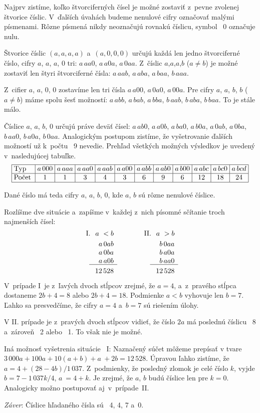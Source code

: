 {%
Najprv zistíme, koľko štvorciferných čísel je možné
zostaviť z~pevne zvolenej štvorice číslic. V~ďalších úvahách
budeme nenulové cifry označovať malými písmenami. Rôzne písmená nikdy
neoznačujú rovnakú číslicu, symbol~ 0 označuje nulu.

 Štvorice číslic $(a,a,a,a)$ a~$(a,0,0,0)$ určujú každá
len jedno štvorciferné číslo, cifry $a$, $a$, $a$, 0 tri:
$a\,aa0$, $a\,a0a$, $a\,0aa$. Z~číslic $a$,$a$,$a$,$b$ ($a\ne
b$) je možné zostaviť len štyri štvorciferné čísla: $a\,aab$,
$a\,aba$, $a\,baa$, $b\,aaa$.

 Z~cifier $a$, $a$, 0, 0 zostavíme len tri čísla $a\,a00$, $a\,0a0$,
$a\,00a$. Pre cifry $a$, $a$, $b$, $b$ ($a\ne b$) máme spolu
šesť možností: $a\,abb$, $a\,bab$, $a\,bba$, $b\,aab$, $b\,aba$,
$b\,baa$. To je stále málo.

 Číslice $a$, $a$, $b$, 0 určujú práve deväť čísel: $a\,ab0$,
$a\,a0b$, $a\,ba0$, $a\,b0a$, $a\,0ab$, $a\,0ba$, $b\,aa0$,
$b\,a0a$, $b\,0aa$. Analogickým postupom zistíme, že vyšetrovanie
ďalších možností už k~počtu~ 9 nevedie. Prehľad všetkých možných
výsledkov je uvedený v~nasledujúcej tabuľke.
$$
\vbox{  \offinterlineskip
\spaceskip .29em
\halign{\strut\vrule#&\ #\hss\ \vrule&&\hss\ $#$ \hss\vrule\cr
\noalign{\hrule}%
 & Typ  &a\,000&a\,aaa&a\,aa0&a\,aab&a\,a00&a\,abb&a\,ab0&a\,b00&a\,abc&a\,bc0&a\,bcd \cr
\noalign{\hrule}%
 & Počet & 1  & 1  & 3  & 4  & 3  & 6  & 9  & 6  & 12  & 18  & 24 \cr
\noalign{\hrule}%
}}
$$

 Dané číslo má teda cifry $a$, $a$, $b$, 0, kde $a$, $b$
sú rôzne nenulové číslice.

  Rozlíšme dve situácie a~zapíšme v~každej z~nich písomné
sčítanie troch najmenších čísel:
$$
\vbox{\let\par\cr
\def\AAAAA{\omit\kern-.5em\vrule width 4em
height.4pt\relax\kern-.5em}
\halign{&\hss#\ &\hss$#$&\qquad\qquad# \cr
           I.& a~< b            &&       II.&  a~> b \cr
\noalign{\smallskip}%
             & a\,0ab           &&          &   b\,0aa \cr
             & a\,0ba           &&          &   b\,a0a \cr
             & a\,a0b           &&          &   b\,aa0 \cr
\noalign{\nointerlineskip\vskip2pt}%
             &\AAAAA            &&          &\AAAAA \cr
             &12\,528           &&          &  12\,528 \cr
}}
$$

  V~prípade I~je z~ľavých dvoch stĺpcov zrejmé, že $a = 4$,
a~z~pravého stĺpca dostaneme $2b + 4 = 8$ alebo $2b + 4 = 18$.
Podmienke $a < b$ vyhovuje len $b = 7$. Ľahko sa presvedčíme, že
cifry $a = 4$ a~$b = 7$ sú riešením úlohy.

 V II. prípade je z~pravých dvoch stĺpcov vidieť, že číslo $2a$ má
poslednú číslicu~ 8 a~zároveň~ 2 alebo~ 1. To však nie je možné.

 Iná možnosť vyšetrenia situácie~ I: Naznačený súčet môžeme
prepísať v tvare $3\,000a + 100a + 10(a+b) + a~+ 2b = 12\,528$.
Úpravou ľahko zistíme, že $a = 4 + (28-4b)/1\,037$.
Z~podmienky, že posledný zlomok je celé číslo $k$, vyjde $b = 7 -
1\,037k/4$, $ a~= 4 + k$. Je zrejmé, že $a$, $b$ budú
číslice len pre $k = 0$. Analogicky možno postupovať aj~v~prípade~II.

  {\it Záver\/}: Číslice hľadaného čísla sú~ 4, 4, 7 a~0.
}

